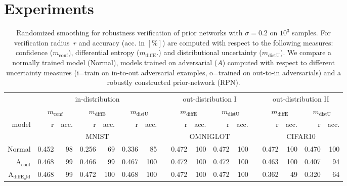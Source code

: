 
\section{Experiments}



\begin{table}[ht]
	\centering
	\caption{Randomized smoothing for robustness verification of prior networks with $\sigma=0.2$ on $10^3$ samples. For verification radius~$r$ and accuracy (acc. in $[\%]$) are computed with respect to the following measures: confidence ($m_{\mathrm{conf}}$), differential entropy ($m_{\mathrm{diffE}}$.) and distributional uncertainty ($m_{\mathrm{distU}}$). We compare a normally trained model (Normal), models trained on adversarial ($A$) computed with respect to different uncertainty measures (i=train on in-to-out adversarial examples, o=trained on out-to-in adversarials) and a robustly constructed prior-network (RPN).}
	\begin{tiny}
		\begin{tabular}{@{}rrrrrrrcrrrrcrrrr@{}}
			\toprule
			& \multicolumn{6}{c}{in-distribution} &  & \multicolumn{4}{c}{out-distribution I} &   & \multicolumn{4}{c}{out-distribution II} \\
			& \multicolumn{2}{c}{$m_{\mathrm{conf}}$}  & \multicolumn{2}{c}{$m_{\mathrm{diffE}}$} &  \multicolumn{2}{c}{$m_{\mathrm{distU}}$} &   
			& \multicolumn{2}{c}{$m_{\mathrm{diffE}}$} & \multicolumn{2}{c}{$m_{\mathrm{distU}}$} & 
			& \multicolumn{2}{c}{$m_{\mathrm{diffE}}$} & \multicolumn{2}{c}{$m_{\mathrm{distU}}$} \\
			\cmidrule{2-3}  \cmidrule{4-5} \cmidrule{6-7} \cmidrule{9-10}  \cmidrule{11-12} \cmidrule{14-15} \cmidrule{16-17}
			model & r & acc. & r & acc. & r & acc. & & r & acc. & r & acc. & & r & acc. & r & acc. \\
			\midrule
			& \multicolumn{6}{c}{MNIST} & & \multicolumn{4}{c}{OMNIGLOT} & & \multicolumn{4}{c}{CIFAR10} \\
			Normal                        & 0.452 & 98 & 0.256 & 69 & 0.336 & 85 & & 0.472 & 100 & 0.472 & 100 & & 0.472 & 100 & 0.470 & 100 \\
			$\mathrm{A}_{\mathrm{conf}}$  & 0.468 & 99 & 0.466 & 99 & 0.467 & 100 & & 0.472 & 100 & 0.472 & 100 & & 0.463 & 100 & 0.407 & 94 \\
			$\mathrm{A}_{\mathrm{diffE_old}}$ & 0.468 & 99 & 0.472 & 100 & 0.468 & 100 & & 0.472 & 100 & 0.472 & 100 & & 0.362 & 49 & 0.320 & 64 \\

\end{tabular}
\end{tiny}
\end{table}
